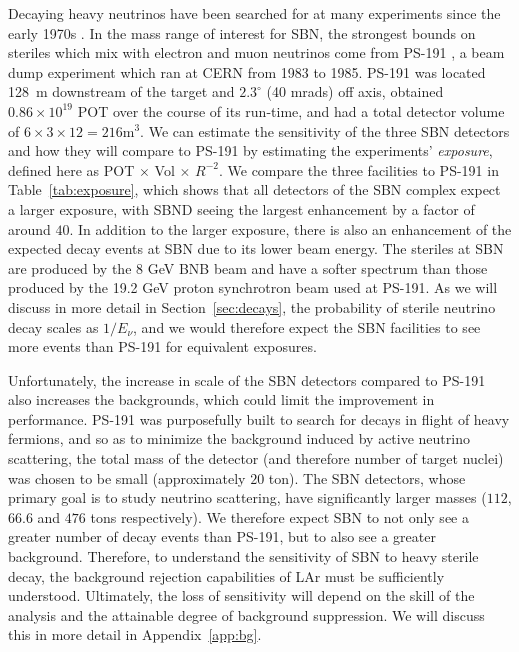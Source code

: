 \documentclass[11pt, a4paper]{article}
\newcommand{\refsec}[1]{Section~\ref{#1}}
\newcommand{\refapp}[1]{Appendix~\ref{#1}}
\newcommand{\reftab}[1]{Table~\ref{#1}}
\begin{document}
Decaying heavy neutrinos have been searched for at many experiments since the
early 1970s \cite{}. In the mass range of interest for SBN, the strongest
bounds on steriles which mix with electron and muon neutrinos come from PS-191
\cite{Bernardi:1985ny}, a beam dump experiment which ran at CERN from 1983 to
1985. 
%
PS-191 was located 128~m downstream of the target and $2.3^\circ$ (40 mrads)
off axis, obtained $0.86 \times 10^{19}$ POT over the course of its run-time,
and had a total detector volume of $6\times3\times12 = 216 \text{m}^3$. We can
estimate the sensitivity of the three SBN detectors and how they will compare
to PS-191 by estimating the experiments' \emph{exposure}, defined here as POT
$\times$ Vol $\times$ $R^{-2}$. We compare the three facilities to PS-191 in
\reftab{tab:exposure}, which shows that all detectors of the SBN complex expect
a larger exposure, with SBND seeing the largest enhancement by a factor of
around $40$. 
%
In addition to the larger exposure, there is also an enhancement of the
expected decay events at SBN due to its lower beam energy. The steriles at SBN
are produced by the 8 GeV BNB beam and have a softer spectrum than those
produced by the 19.2 GeV proton synchrotron beam used at PS-191. As we will
discuss in more detail in \refsec{sec:decays}, the probability of sterile
neutrino decay scales as $1/E_\nu$, and we would therefore expect the SBN
facilities to see more events than PS-191 for equivalent exposures.

Unfortunately, the increase in scale of the SBN detectors compared to PS-191
also increases the backgrounds, which could limit the improvement in
performance.  PS-191 was purposefully built to search for decays in flight of
heavy fermions, and so as to minimize the background induced by active neutrino
scattering, the total mass of the detector (and therefore number of target
nuclei) was chosen to be small (approximately $20$ ton).  The SBN detectors,
whose primary goal is to study neutrino scattering, have significantly larger
masses ($112$, $66.6$ and $476$ tons respectively).  We therefore expect SBN to
not only see a greater number of decay events than PS-191, but to also see a
greater background. 
%
Therefore, to understand the sensitivity of SBN to heavy sterile decay, the
background rejection capabilities of LAr must be sufficiently understood.
Ultimately, the loss of sensitivity will depend on the skill of the analysis
and the attainable degree of background suppression. We will discuss this in
more detail in \refapp{app:bg}.
\end{document}
